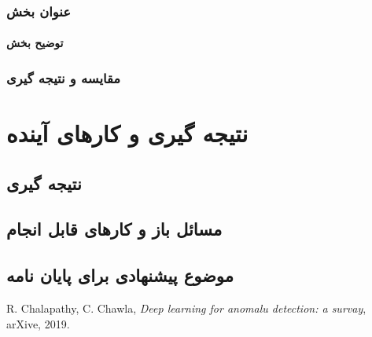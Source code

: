 \documentclass[12pt,a4paper]{report}
\theoremstyle{definition}
\theoremstyle{theorem}
\theoremstyle{definition}
\begin{document}
	\subsection{عنوان بخش}
	\subsubsection{توضیح بخش}
	\subsection{مقایسه و نتیجه گیری}
	\chapter{نتیجه گیری و کار‌های آینده}
	\section{نتیجه گیری}
	\section{مسائل باز و کارهای قابل انجام}
	\section{موضوع پیشنهادی برای پایان نامه}
	\newpage
	
	\small
\begin{thebibliography}{99}

\begin{LTRitems}

\resetlatinfont

R. Chalapathy, C. Chawla, {\em Deep learning for anomalu detection: a survay},  arXive, 2019.

\end{LTRitems}

\end{thebibliography}

\printindex
\end{document}
